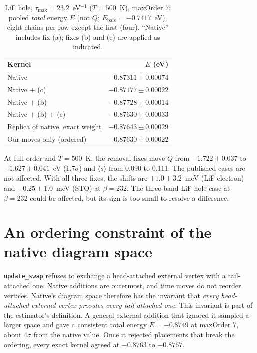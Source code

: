 \documentclass[aps,prb,reprint,superscriptaddress,nofootinbib]{revtex4-2}
\newcommand{\avg}[1]{\langle #1\rangle}
\newcommand{\code}[1]{\texttt{#1}}
\begin{document}
\begin{table}
\caption{\label{tab:maxorder7}LiF hole, $\tau_{\max}=23.2$~eV$^{-1}$ ($T=500$~K), maxOrder 7: pooled \emph{total} energy $E$ (not $Q$; $E_{\mathrm{bare}}=-0.7417$~eV), eight chains per row except the first (four). ``Native'' includes fix (a); fixes (b) and (c) are applied as indicated.}
\begin{ruledtabular}
\begin{tabular}{lr}
Kernel & $E$ (eV) \\
\midrule
Native & $-0.87311\pm0.00074$ \\
Native + (c) & $-0.87177\pm0.00022$ \\
Native + (b) & $-0.87728\pm0.00014$ \\
Native + (b) + (c) & $-0.87630\pm0.00033$ \\
Replica of native, exact weight & $-0.87643\pm0.00029$ \\
Our moves only (ordered) & $-0.87630\pm0.00022$ \\
\end{tabular}
\end{ruledtabular}
\end{table}

At full order and $T=500$~K, the removal fixes move $Q$ from $-1.722\pm0.037$ to $-1.627\pm0.041$~eV ($1.7\sigma$) and $\avg{s}$ from 0.090 to 0.111. The published cases are not affected. With all three fixes, the shifts are $+1.0\pm3.2$~meV (LiF electron) and $+0.25\pm1.0$~meV (STO) at $\beta=232$. The three-band LiF-hole case at $\beta=232$ could be affected, but its sign is too small to resolve a difference.

\section{An ordering constraint of the native diagram space}

\code{update\_swap} refuses to exchange a head-attached external vertex with a tail-attached one. Native additions are outermost, and time moves do not reorder vertices. Native's diagram space therefore has the invariant that \emph{every head-attached external vertex precedes every tail-attached one}. This invariant is part of the estimator's definition. A general external addition that ignored it sampled a larger space and gave a consistent total energy $E=-0.8749$ at maxOrder 7, about $4\sigma$ from the native value. Once it rejected placements that break the ordering, every exact kernel agreed at $-0.8763$ to $-0.8767$.
\end{document}
